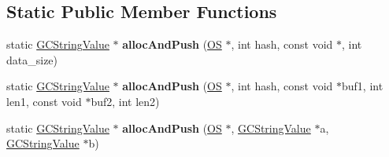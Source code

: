 \subsection*{Static Public Member Functions}
\begin{DoxyCompactItemize}
\item 
static \hyperlink{struct_object_script_1_1_o_s_1_1_core_1_1_g_c_string_value}{G\+C\+String\+Value} $\ast$ {\bfseries alloc\+And\+Push} (\hyperlink{class_object_script_1_1_o_s}{OS} $\ast$, int hash, const void $\ast$, int data\+\_\+size)\hypertarget{struct_object_script_1_1_o_s_1_1_core_1_1_g_c_string_value_ac6bea91bff1deba3932987467ab080fa}{}\label{struct_object_script_1_1_o_s_1_1_core_1_1_g_c_string_value_ac6bea91bff1deba3932987467ab080fa}

\item 
static \hyperlink{struct_object_script_1_1_o_s_1_1_core_1_1_g_c_string_value}{G\+C\+String\+Value} $\ast$ {\bfseries alloc\+And\+Push} (\hyperlink{class_object_script_1_1_o_s}{OS} $\ast$, int hash, const void $\ast$buf1, int len1, const void $\ast$buf2, int len2)\hypertarget{struct_object_script_1_1_o_s_1_1_core_1_1_g_c_string_value_a5a6b9c7ad2d151834d8afc19d587c8c8}{}\label{struct_object_script_1_1_o_s_1_1_core_1_1_g_c_string_value_a5a6b9c7ad2d151834d8afc19d587c8c8}

\item 
static \hyperlink{struct_object_script_1_1_o_s_1_1_core_1_1_g_c_string_value}{G\+C\+String\+Value} $\ast$ {\bfseries alloc\+And\+Push} (\hyperlink{class_object_script_1_1_o_s}{OS} $\ast$, \hyperlink{struct_object_script_1_1_o_s_1_1_core_1_1_g_c_string_value}{G\+C\+String\+Value} $\ast$a, \hyperlink{struct_object_script_1_1_o_s_1_1_core_1_1_g_c_string_value}{G\+C\+String\+Value} $\ast$b)\hypertarget{struct_object_script_1_1_o_s_1_1_core_1_1_g_c_string_value_acdc4dda2d11ac144d321b59ebf419de8}{}\label{struct_object_script_1_1_o_s_1_1_core_1_1_g_c_string_value_acdc4dda2d11ac144d321b59ebf419de8}

\end{DoxyCompactItemize}
